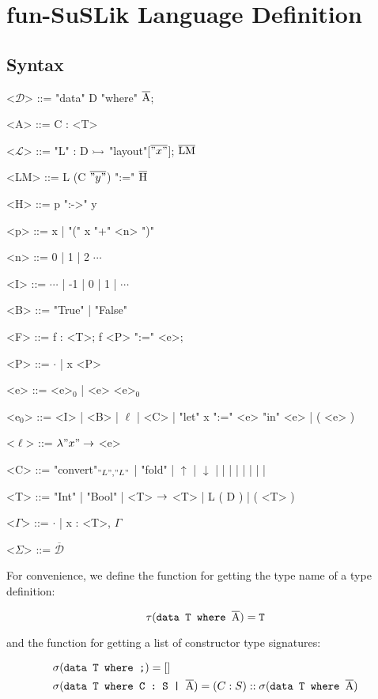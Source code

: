 \documentclass[10pt]{article}
\begin{document}
\section{fun-SuSLik Language Definition}
\label{sec:FSDef}
\subsection{Syntax}

\begin{grammar}
  <$\mathcal{D}$> ::= "data" D "where" $\overline{\textnormal{A}}$;

  <A> ::= C : <T>

  <$\mathcal{L}$> ::= "L" : D $\rightarrowtail$ "layout"[$\overline{"x"}$]; $\overline{\textnormal{LM}}$

  <LM> ::= L (C $\overline{"y"}$) ":=" $\overline{\textnormal{H}}$

  <H> ::= p ":->" y

  <p> ::= x | "(" x "+" <n> ")"

  <n> ::= 0 | 1 | 2 $\cdots$

  <I> ::= $\cdots$ | -1 | 0 | 1 | $\cdots$

  <B> ::= "True" | "False"

  <F> ::= f : <T>; f <P> ":=" <e>;

  <P> ::= $\cdot$ | x <P>

  <e> ::= <e>$_0$ | <e> <e>$_0$

  <e$_0$> ::= <I> | <B> | $\ell$ | <C> | "let" x ":=" <e> "in" <e> | ( <e> )

  <$\ell$> ::= $\lambda "x" \rightarrow$ <e>

  <C> ::= "convert"$_{"L","L"}$ | "fold" | $\uparrow$ | $\downarrow$ | \ite\; | \lesseq\; | \eq\; | \add\; | \sub\; | \; | \; | 

  <T> ::= "Int" | "Bool" | <T> $\rightarrow$ <T> | L ( D ) | ( <T> )

  <$\Gamma$> ::= $\cdot$ | x : <T>, $\Gamma$

  <$\Sigma$> ::= $\overline{\mathcal{D}}$
\end{grammar}

\noindent
For convenience, we define the function for getting the type name of a type definition:

\[
  \tau(\texttt{data T where }\overline{\textnormal{A}}) = \texttt{T}
\]

and the function for getting a list of constructor type signatures:

\begin{align*}
  &\sigma(\texttt{data T where ;}) = []
  \\
  &\sigma(\texttt{data T where C : S | }\overline{\textnormal{A}}) = (C : S) :: \sigma({\texttt{data T where }}\overline{\textnormal{A}})
\end{align*}
\end{document}

